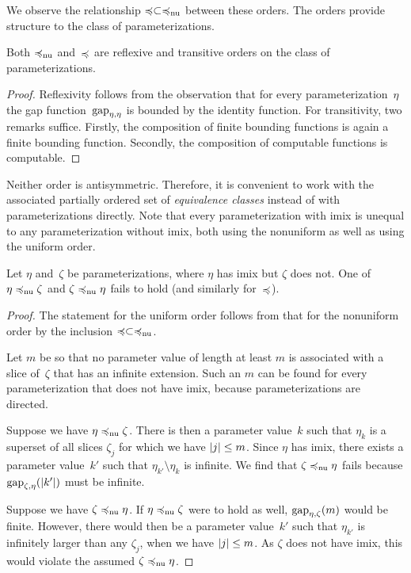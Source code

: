 We observe the relationship $\preccurlyeq \subset \preccurlyeq_\mathrm{nu}$ between these orders.
The orders provide structure to the class of parameterizations.
\begin{lemma}
\label{lem:preorder}%
  Both $\preccurlyeq_\mathrm{nu}$ and~$\preccurlyeq$ are reflexive and transitive orders on the class of parameterizations.
\end{lemma}
\begin{proof}
  Reflexivity follows from the observation that for every parameterization~$\eta$ the gap function~$\operatorname{gap}_{\eta, \eta}$ is bounded by the identity function.
  For transitivity, two remarks suffice.
  Firstly, the composition of finite bounding functions is again a finite bounding function.
  Secondly, the composition of computable functions is computable.
\end{proof}

Neither order is antisymmetric.
Therefore, it is convenient to work with the associated partially ordered set of \emph{equivalence classes} instead of with parameterizations directly.
Note that every parameterization with imix is unequal to any parameterization without imix, both using the nonuniform as well as using the uniform order.

\begin{lemma}
\label{lem:imix}%
  Let $\eta$ and~$\zeta$ be parameterizations, where $\eta$ has imix but $\zeta$ does not.
  One of $\eta \preccurlyeq_\mathrm{nu} \zeta$ and $\zeta \preccurlyeq_\mathrm{nu} \eta$ fails to hold (and similarly for~$\preccurlyeq$).
\end{lemma}
\begin{proof}
  The statement for the uniform order follows from that for the nonuniform order by the inclusion $\preccurlyeq \subset \preccurlyeq_\mathrm{nu}$.

  Let $m$ be so that no parameter value of length at least $m$ is associated with a slice of~$\zeta$ that has an infinite extension.
  Such an $m$ can be found for every parameterization that does not have imix, because parameterizations are directed.

  Suppose we have $\eta \preccurlyeq_\mathrm{nu} \zeta$.
  There is then a parameter value~$k$ such that $\eta_k$ is a superset of all slices $\zeta_j$ for which we have ${\lvert j\rvert} \le m$.
  Since $\eta$ has imix, there exists a parameter value~$k'$ such that $\eta_{k'} \setminus \eta_k$ is infinite.
  We find that $\zeta \preccurlyeq_\mathrm{nu} \eta$ fails because $\operatorname{gap}_{\zeta, \eta}({\lvert k'\rvert})$ must be infinite.

  Suppose we have $\zeta \preccurlyeq_\mathrm{nu} \eta$.
  If $\eta \preccurlyeq_\mathrm{nu} \zeta$ were to hold as well, $\operatorname{gap}_{\eta, \zeta}(m)$ would be finite.
  However, there would then be a parameter value~$k'$ such that $\eta_{k'}$ is infinitely larger than any $\zeta_j$, when we have ${\lvert j\rvert} \le m$.
  As $\zeta$ does not have imix, this would violate the assumed $\zeta \preccurlyeq_\mathrm{nu} \eta$.
\end{proof}


